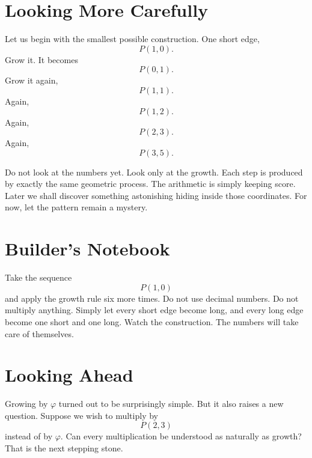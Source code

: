 \section*{Looking More Carefully}

Let us begin with the smallest possible construction. One short edge,
\[
P(1,0).
\]
Grow it. It becomes
\[
P(0,1).
\]
Grow it again,
\[
P(1,1).
\]
Again,
\[
P(1,2).
\]
Again,
\[
P(2,3).
\]
Again,
\[
P(3,5).
\]

Do not look at the numbers yet. Look only at the growth. Each step is produced by exactly the same geometric process. The arithmetic is simply keeping score. Later we shall discover something astonishing hiding inside those coordinates. For now, let the pattern remain a mystery.

\section*{Builder's Notebook}

Take the sequence
\[
P(1,0)
\]
and apply the growth rule six more times. Do not use decimal numbers. Do not multiply anything. Simply let every short edge become long, and every long edge become one short and one long. Watch the construction. The numbers will take care of themselves.

\section*{Looking Ahead}

Growing by \(\varphi\) turned out to be surprisingly simple. But it also raises a new question. Suppose we wish to multiply by
\[
P(2,3)
\]
instead of by \(\varphi\). Can every multiplication be understood as naturally as growth? That is the next stepping stone.
